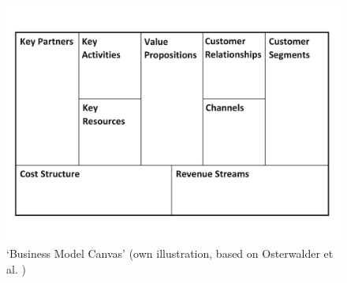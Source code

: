 		\begin{figure}[ht]
		    \begin{center}
			    \includegraphics[scale=0.4]{Talk11/bmc_blocks_only.pdf}
		    \end{center}
		    \caption{`Business Model Canvas' (own illustration, based on Osterwalder et al. \cite{osterwalder})}
		    \label{fig:bmc}
		\end{figure}

